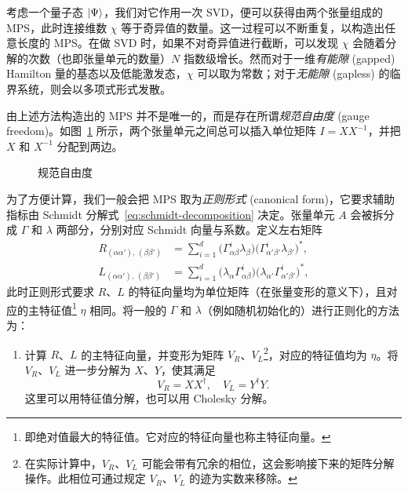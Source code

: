 考虑一个量子态 $\ket{\Psi}$，我们对它作用一次 SVD，便可以获得由两个张量组成的 MPS，此时连接维数 $\chi$ 等于奇异值的数量。这一过程可以不断重复，以构造出任意长度的 MPS。在做 SVD 时，如果不对奇异值进行截断，可以发现 $\chi$ 会随着分解的次数（也即张量单元的数量）$N$ 指数级增长。然而对于一维\emph{有能隙} (gapped) Hamilton 量的基态以及低能激发态，$\chi$ 可以取为常数；对于\emph{无能隙} (gapless) 的临界系统，则会以多项式形式发散。


由上述方法构造出的 MPS 并不是唯一的，而是存在所谓\emph{规范自由度} (gauge freedom)。如图~\ref{fig:mps-gauge-freedom} 所示，两个张量单元之间总可以插入单位矩阵 $I=XX^{-1}$，并把 $X$ 和 $X^{-1}$ 分配到两边。

\begin{figure}[htb]
  \centering
  \caption{规范自由度}
  \label{fig:mps-gauge-freedom}
\end{figure}

为了方便计算，我们一般会把 MPS 取为\emph{正则形式} (canonical form)，它要求辅助指标由 Schmidt 分解式~\eqref{eq:schmidt-decomposition} 决定。张量单元 $A$ 会被拆分成 $\Gamma$ 和 $\lambda$ 两部分，分别对应 Schmidt 向量与系数。定义左右矩阵
\begin{equation}
  \begin{aligned}
       R_{(\alpha\alpha'), \, (\beta\beta')}
    &= \sum_{i=1}^d \bigl( \Gamma^i_{\alpha\beta} \lambda_\beta \bigr) \bigl( \Gamma^i_{\alpha'\beta'} \lambda_{\beta'} \bigr)^*, \\
       L_{(\alpha\alpha'), \, (\beta\beta')}
    &= \sum_{i=1}^d \bigl( \lambda_\alpha \Gamma^i_{\alpha\beta} \bigr) \bigl( \lambda_{\alpha'} \Gamma^i_{\alpha'\beta'} \bigr)^*,
  \end{aligned}
\end{equation}
此时正则形式要求 $R$、$L$ 的特征向量均为单位矩阵（在张量变形的意义下），且对应的主特征值\footnote{即绝对值最大的特征值。它对应的特征向量也称主特征向量。} $\eta$ 相同。将一般的 $\Gamma$ 和 $\lambda$（例如随机初始化的）进行正则化的方法为：

\begin{enumerate}
  \item 计算 $R$、$L$ 的主特征向量，并变形为矩阵 $V_R$、$V_L$\footnote{在实际计算中，$V_R$、$V_L$ 可能会带有冗余的相位，这会影响接下来的矩阵分解操作。此相位可通过规定 $V_R$、$V_L$ 的迹为实数来移除。}，对应的特征值均为 $\eta$。将 $V_R$、$V_L$ 进一步分解为 $X$、$Y$，使其满足
    \begin{equation}
      V_R = X X^\dagger, \quad V_L = Y^\dagger Y.
    \end{equation}
    这里可以用特征值分解，也可以用 Cholesky 分解。
\end{enumerate}

